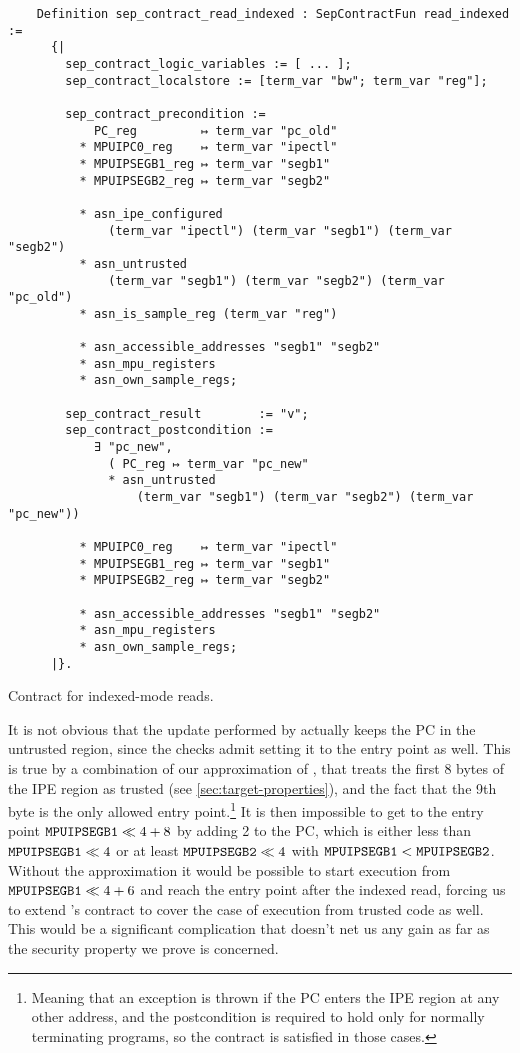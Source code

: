 \begin{listing}
  \begin{verbatim}
    Definition sep_contract_read_indexed : SepContractFun read_indexed :=
      {|
        sep_contract_logic_variables := [ ... ];
        sep_contract_localstore := [term_var "bw"; term_var "reg"];

        sep_contract_precondition :=
            PC_reg         ↦ term_var "pc_old"
          * MPUIPC0_reg    ↦ term_var "ipectl"
          * MPUIPSEGB1_reg ↦ term_var "segb1"
          * MPUIPSEGB2_reg ↦ term_var "segb2"

          * asn_ipe_configured
              (term_var "ipectl") (term_var "segb1") (term_var "segb2")
          * asn_untrusted
              (term_var "segb1") (term_var "segb2") (term_var "pc_old")
          * asn_is_sample_reg (term_var "reg")

          * asn_accessible_addresses "segb1" "segb2"
          * asn_mpu_registers
          * asn_own_sample_regs;

        sep_contract_result        := "v";
        sep_contract_postcondition :=
            ∃ "pc_new",
              ( PC_reg ↦ term_var "pc_new"
              * asn_untrusted
                  (term_var "segb1") (term_var "segb2") (term_var "pc_new"))

          * MPUIPC0_reg    ↦ term_var "ipectl"
          * MPUIPSEGB1_reg ↦ term_var "segb1"
          * MPUIPSEGB2_reg ↦ term_var "segb2"

          * asn_accessible_addresses "segb1" "segb2"
          * asn_mpu_registers
          * asn_own_sample_regs;
      |}.
  \end{verbatim}
  \caption{Contract for indexed-mode reads.}
  \label{lst:read_indexed}
\end{listing}

It is not obvious that the update performed by  actually keeps the PC in the untrusted region, since the checks admit setting it to the entry point as well. This is true by a combination of our approximation of , that treats the first 8 bytes of the IPE region as trusted (see \cref{sec:target-properties}), and the fact that the 9th byte is the only allowed entry point.\footnote{Meaning that an exception is thrown if the PC enters the IPE region at any other address, and the postcondition is required to hold only for normally terminating programs, so the contract is satisfied in those cases.} It is then impossible to get to the entry point \(\reg{MPUIPSEGB1} \ll 4 + 8\) by adding 2 to the PC, which is either less than \(\reg{MPUIPSEGB1} \ll 4\) or at least \(\reg{MPUIPSEGB2} \ll 4\) with \(\reg{MPUIPSEGB1} < \reg{MPUIPSEGB2}\). Without the approximation it would be possible to start execution from \(\reg{MPUIPSEGB1} \ll 4 + 6\) and reach the entry point after the indexed read, forcing us to extend 's contract to cover the case of execution from trusted code as well. This would be a significant complication that doesn't net us any gain as far as the security property we prove is concerned.

